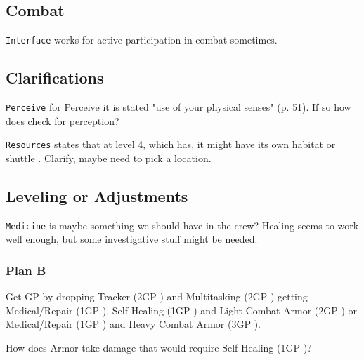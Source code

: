 \subsection{Combat}

\texttt{Interface} works for active participation in combat sometimes.  \citep[p. 50]{ep2e_1.1_2019}


\subsection{Clarifications}

\texttt{Perceive}  for Perceive it is stated "use of your physical senses" (p. 51). If so how does \egr{} check for perception?

\texttt{Resources} states that at level 4, which \egr{} has, it might have its own habitat or shuttle \citep[p. 75]{ep2e_1.1_2019}. Clarify, maybe need to pick a location.


\subsection{Leveling or Adjustments}

\texttt{Medicine} is maybe something we should have in the crew? Healing seems to work well enough, but some investigative stuff might be needed.

\subsubsection{Plan B}

Get GP by dropping Tracker (2GP \citep[p. 326]{ep2e_1.1_2019}) and Multitasking (2GP \citep[p. 320]{ep2e_1.1_2019}) getting Medical/Repair (1GP \citep[p. 217]{ep2e_1.1_2019}), Self-Healing (1GP \citep[p. 217]{ep2e_1.1_2019}) and Light Combat Armor (2GP \citep[p. 215]{ep2e_1.1_2019}) or Medical/Repair (1GP \citep[p. 217]{ep2e_1.1_2019}) and Heavy Combat Armor (3GP \citep[p. 215]{ep2e_1.1_2019}).

How does Armor take damage that would require Self-Healing (1GP \citep[p. 217]{ep2e_1.1_2019})?